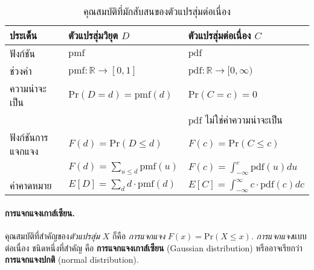 \begin{table}[hbtp]
		\caption{คุณสมบัติที่มักสับสนของตัวแปรสุ่มต่อเนื่อง}
		\begin{center}
			\begin{tabular}{l|l|l}
				\hline
ประเด็น & ตัวแปรสุ่มวิยุต $D$ & ตัวแปรสุ่มต่อเนื่อง $C$
\\ \hline
ฟังก์ชัน & $\mathrm{pmf}$ & $\mathrm{pdf}$ 
\nonumber \\
ช่วงค่า  & $\mathrm{pmf}: \mathbb{R} \rightarrow [0, 1]$
& $\mathrm{pdf}: \mathbb{R} \rightarrow [0, \infty)$
\\
ความน่าจะเป็น & $\mathrm{Pr}(D = d) = \mathrm{pmf}(d)$			
& $\mathrm{Pr}(C = c) = 0$ \\	
& & $\mathrm{pdf}$ ไม่ใช่ค่าความน่าจะเป็น
\\
\hline
ฟังก์ชันการแจกแจง & $F(d) = \mathrm{Pr}(D \leq d)$ & $F(c) = \mathrm{Pr}(C \leq c)$
\\
& $F(d)= \sum_{u \leq d} \mathrm{pmf}(u)$
&
  $F(c)= \int_{-\infty}^c \mathrm{pdf}(u) du$
\\
\hline
ค่าคาดหมาย & $E[D] = \sum_d d \cdot \mathrm{pmf}(d)$
& $E[C] = \int_{-\infty}^{\infty} c \cdot \mathrm{pdf}(c) dc$
\\
\hline
			\end{tabular} 
		\end{center}
		\label{tbl: prob continuous rv}
\end{table}


\paragraph{การแจกแจงเกาส์เซียน.}
คุณสมบัติที่สำคัญของ\textit{ตัวแปรสุ่ม} $X$
ก็คือ
\textit{การแจกแจง} $F(x) = \mathrm{Pr}(X \leq x)$.
\textit{การแจกแจง}แบบต่อเนื่อง ชนิดหนึ่งที่สำคัญ คือ
\textbf{การแจกแจงเกาส์เซียน} (Gaussian distribution)
หรืออาจเรียกว่า 
\textbf{การแจกแจงปกติ} (normal distribution).


